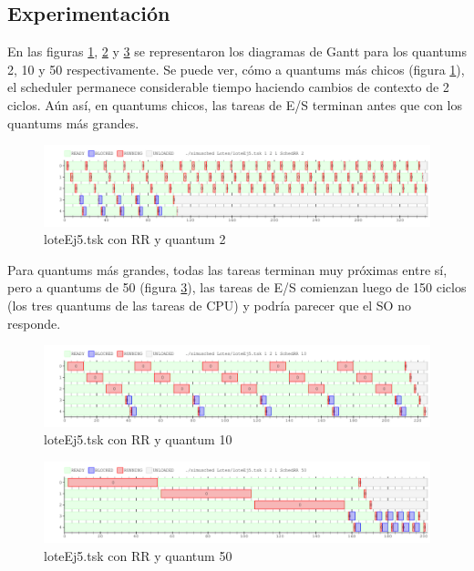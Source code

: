 \subsection{Experimentación}
En las figuras \ref{fig:ej5q2},  \ref{fig:ej5q10} y \ref{fig:ej5q50} se representaron los diagramas de Gantt para los quantums 2, 10 y 50 respectivamente. Se puede ver, cómo a quantums más chicos (figura \ref{fig:ej5q2}), el scheduler permanece considerable tiempo haciendo cambios de contexto de 2 ciclos. Aún así, en quantums chicos, las tareas de E/S terminan antes que con los quantums más grandes.\par
\begin{figure}[H]
  \centering
    \includegraphics[width=1.1\textwidth]{imagenes/Ej5_q2.png}
  \caption{loteEj5.tsk con RR y quantum 2}\label{fig:ej5q2}
\end{figure}
Para quantums más grandes, todas las tareas terminan muy próximas entre sí, pero a quantums de 50 (figura \ref{fig:ej5q50}), las tareas de E/S comienzan luego de 150 ciclos (los tres quantums de las tareas de CPU) y podría parecer que el SO no responde.\par
\begin{figure}[H]
  \centering
    \includegraphics[width=1.1\textwidth]{imagenes/Ej5_q10.png}
  \caption{loteEj5.tsk con RR y quantum 10}\label{fig:ej5q10}
\end{figure}
\begin{figure}[H]
  \centering
    \includegraphics[width=1.1\textwidth]{imagenes/Ej5_q50.png}
  \caption{loteEj5.tsk con RR y quantum 50}\label{fig:ej5q50}
\end{figure}

